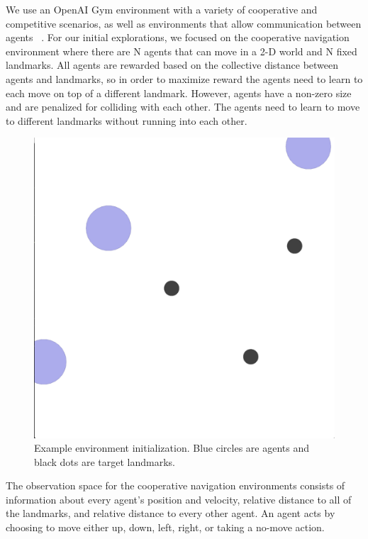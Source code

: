 \documentclass{article}
\begin{document}
We use an OpenAI Gym environment with a variety of cooperative and competitive scenarios, as well as environments that allow communication between agents ~\cite{openaigym}. For our initial explorations, we focused on the cooperative navigation environment where there are N agents that can move in a 2-D world and N fixed landmarks. All agents are rewarded based on the collective distance between agents and landmarks, so in order to maximize reward the agents need to learn to each move on top of a different landmark. However, agents have a non-zero size and are penalized for colliding with each other. The agents need to learn to move to different landmarks without running into each other.

\begin{figure}
\begin{center}
\includegraphics[scale=0.15]{env-image}
\end{center}
\caption{Example environment initialization. Blue circles are agents and black dots are target landmarks.}
\end{figure}

The observation space for the cooperative navigation environments consists of information about every agent's position and velocity, relative distance to all of the landmarks, and relative distance to every other agent. An agent acts by choosing to move either up, down, left, right, or taking a no-move action. 
\end{document}

